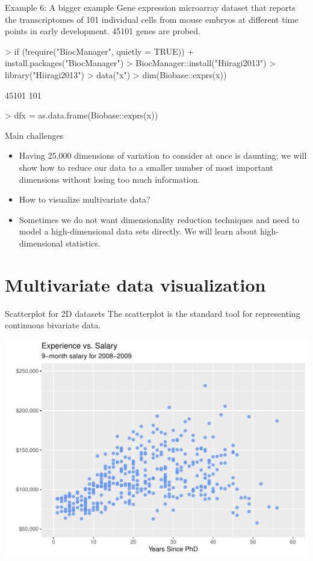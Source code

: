 \documentclass[11pt,handout,aspectratio=169]{beamer}
\begin{document}
\begin{frame}[fragile]{Example 6: A bigger example }
Gene expression microarray dataset that reports the transcriptomes of 101 individual cells from mouse embryos at different time points in early development. 45101 genes are probed.
\scriptsize
\begin{Schunk}
\begin{Sinput}
> if (!require("BiocManager", quietly = TRUE))
+     install.packages("BiocManager")
> BiocManager::install("Hiiragi2013")
> library("Hiiragi2013")
> data("x")
> dim(Biobase::exprs(x))
\end{Sinput}
\begin{Soutput}
[1] 45101   101
\end{Soutput}
\begin{Sinput}
> dfx = as.data.frame(Biobase::exprs(x))
\end{Sinput}
\end{Schunk}
\end{frame}

\begin{frame}{Main challenges}
\begin{itemize}
	\item Having 25{,}000 dimensions of variation to consider at once is daunting; we will show how to reduce our data to a smaller number of most important dimensions without losing too much information.
	\item How to visualize multivariate data?
	\item Sometimes we do not want dimensionality reduction techniques and need to model a high-dimensional data sets directly. We will learn about high-dimensional statistics. 
\end{itemize}	
\end{frame}
 
\section{Multivariate data visualization}

\begin{frame}[fragile]{Scatterplot for 2D datasets}
	The scatterplot is the standard tool for representing continuous bivariate data.
	{\scriptsize
\begin{center}
\includegraphics[width=.6\textwidth]{pics/plot1.1.pdf}		
\end{center}}
\end{frame}
\end{document}
